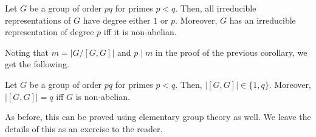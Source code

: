 		\begin{porism}
			Let $G$ be a group of order $pq$ for primes $p<q$. Then, all irreducible representations of $G$ have degree either $1$ or $p$. Moreover, $G$ has an irreducible representation of degree $p$ iff it is non-abelian. 
		\end{porism}

		Noting that $m = |G/[G,G]|$ and $p \mid m$ in the proof of the previous corollary, we get the following.

		\begin{fpor}
			Let $G$ be a group of order $pq$ for primes $p < q$. Then, $|[G,G]| \in \{1,q\}$. Moreover, $|[G,G]| = q$ iff $G$ is non-abelian.
		\end{fpor}

		As before, this can be proved using elementary group theory as well. We leave the details of this as an exercise to the reader.

\clearpage